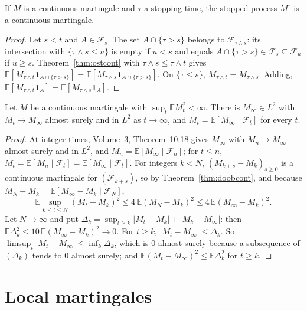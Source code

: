 \begin{corollary}\label{cor:stopped}
If $M$ is a continuous martingale and $\tau$ a stopping time, the stopped process $M^\tau$ is a continuous martingale.
\end{corollary}

\begin{proof}
Let $s<t$ and $A\in\mathcal F_s$. The set $A\cap\{\tau>s\}$ belongs to $\mathcal F_{\tau\wedge s}$: its intersection with $\{\tau\wedge s\le u\}$ is empty if $u<s$ and equals $A\cap\{\tau>s\}\in\mathcal F_s\subseteq\mathcal F_u$ if
$u\ge s$. Theorem~\ref{thm:ostcont} with $\tau\wedge s\le\tau\wedge t$ gives $\mathbb E[M_{\tau\wedge t}\mathbf 1_{A\cap\{\tau>s\}}]=\mathbb E[M_{\tau\wedge s}\mathbf 1_{A\cap\{\tau>s\}}]$. On $\{\tau\le s\}$, $M_{\tau\wedge t}=M_{\tau\wedge s}$.
Adding, $\mathbb E[M_{\tau\wedge t}\mathbf 1_A]=\mathbb E[M_{\tau\wedge s}\mathbf 1_A]$.
\end{proof}

\begin{theorem}[convergence in $L^2$]\label{thm:L2cont}
Let $M$ be a continuous martingale with $\sup_t\mathbb EM_t^2<\infty$. There is $M_\infty\in L^2$ with $M_t\to M_\infty$ almost surely and in $L^2$ as $t\to\infty$, and $M_t=\mathbb E[M_\infty\mid\mathcal F_t]$ for every $t$.
\end{theorem}

\begin{proof}
At integer times, Volume~3, Theorem~10.18 gives $M_\infty$ with $M_n\to M_\infty$ almost surely and in $L^2$, and $M_n=\mathbb E[M_\infty\mid\mathcal F_n]$; for $t\le n$, $M_t=\mathbb E[M_n\mid\mathcal F_t]=\mathbb E[M_\infty\mid\mathcal F_t]$.
For integers $k<N$, $(M_{k+s}-M_k)_{s\ge0}$ is a continuous martingale for $(\mathcal F_{k+s})$, so by Theorem~\ref{thm:doobcont}, and because $M_N-M_k=\mathbb E[M_\infty-M_k\mid\mathcal F_N]$,
\[
\mathbb E\sup_{k\le t\le N}(M_t-M_k)^2\le4\,\mathbb E(M_N-M_k)^2\le4\,\mathbb E(M_\infty-M_k)^2.
\]
Let $N\to\infty$ and put $\Delta_k=\sup_{t\ge k}|M_t-M_k|+|M_k-M_\infty|$: then $\mathbb E\Delta_k^2\le10\,\mathbb E(M_\infty-M_k)^2\to0$. For $t\ge k$, $|M_t-M_\infty|\le\Delta_k$. So $\limsup_t|M_t-M_\infty|\le\inf_k\Delta_k$,
which is $0$ almost surely because a subsequence of $(\Delta_k)$ tends to $0$ almost surely; and $\mathbb E(M_t-M_\infty)^2\le\mathbb E\Delta_k^2$ for $t\ge k$.
\end{proof}

\section{Local martingales}

